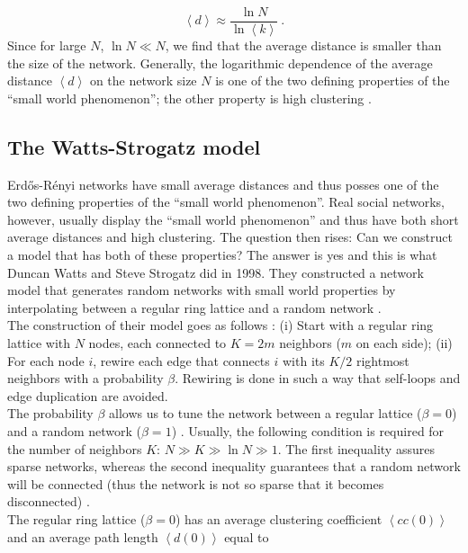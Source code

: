 \documentclass[11 pt , letterpaper , twoside , openright]{book}
\begin{document}
\begin{equation}\label{d}
	\left<d\right> \approx \frac{\ln{N}}{\ln{\left<k\right>}} \ .
\end{equation}
Since for large $N$, $\ln{N} \ll N$, we find that the average distance is smaller than the size of the network. Generally, the logarithmic dependence of the average distance $\left<d\right>$ on the network size $N$ is one of the two defining properties of the ``small world phenomenon''; the other property is high clustering \cite{Easley2010}.

\subsection{The Watts-Strogatz model}

Erd\H{o}s-R\'{e}nyi networks have small average distances and thus posses one of the two defining properties of the ``small world phenomenon''. Real social networks, however, usually display the ``small world phenomenon'' and thus have both short average distances and high clustering. The question then rises: Can we construct a model that has both of these properties? The answer is yes and this is what Duncan Watts and Steve Strogatz did in 1998. They constructed a network model that generates random networks with small world properties by interpolating between a regular ring lattice and a random network \cite{Watts1998}.\\
\newline
The construction of their model goes as follows \cite{Watts1998}: (i) Start with a regular ring lattice with $N$ nodes, each connected to $K = 2m$ neighbors ($m$ on each side); (ii) For each node $i$, rewire each edge that connects $i$ with its $K/2$ rightmost neighbors with a probability $\beta$. Rewiring is done in such a way that self-loops and edge duplication are avoided.\\
\newline
The probability $\beta$ allows us to tune the network between a regular lattice ($\beta = 0$) and a random network ($\beta = 1$) \cite{Watts1998}. Usually, the following condition is required for the number of neighbors $K$: $N \gg K \gg \ln{N} \gg 1$. The first inequality assures sparse networks, whereas the second inequality guarantees that a random network will be connected (thus the network is not so sparse that it becomes disconnected) \cite{Watts1998}.\\
\newline
The regular ring lattice ($\beta=0$) has an average clustering coefficient $\left<cc(0)\right>$ and an average path length $\left<d(0)\right>$ equal to \cite{Watts1998}
\end{document}
